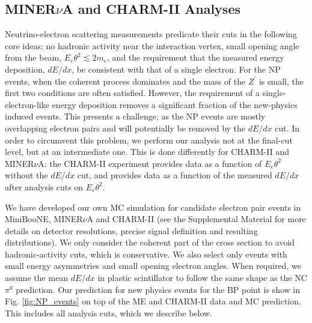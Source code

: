   \subsection{MINER$\nu$A and CHARM-II Analyses}
Neutrino-electron scattering measurements predicate their cuts in the following core ideas: no hadronic activity near the interaction vertex, small opening angle from the beam, $E_e \theta^2 \lesssim 2 m_e$, and the requirement that the measured energy deposition, $dE/dx$, be consistent with that of a single electron. For the NP events, when the coherent process dominates and the mass of the $Z^\prime$ is small, the first two conditions are often satisfied. However, the requirement of a single-electron-like energy deposition removes a significant fraction of the new-physics induced events. This presents a challenge, as the NP events are mostly overlapping electron pairs and will potentially be removed by the $dE/dx$ cut.
In order to circumvent this problem, we perform our analysis not at the final-cut level, but at an intermediate one. This is done differently for CHARM-II and MINER$\nu$A: the CHARM-II experiment provides data as a function of $E_e \theta^2$ without the $dE/dx$ cut, and \minerva provides data as a function of the measured $dE/dx$ after analysis cuts on $E_e \theta^2$.

We have developed our own MC simulation for candidate electron pair events in MiniBooNE, MINER$\nu$A and CHARM-II (see the Supplemental Material for more details on detector resolutions, precise signal definition and resulting distributions). We only consider the coherent part of the cross section to avoid hadronic-activity cuts, which is conservative. We also select only events with small energy asymmetries and small opening electron angles.
When required, we assume the mean $dE/dx$ in plastic scintillator to follow the same shape as the NC $\pi^0$ prediction. Our prediction for new physics events for the BP point is show in Fig. \ref{fig:NP_events} on top of the \minerva ME and CHARM-II data and MC prediction. This includes all analysis cuts, which we describe below.   

